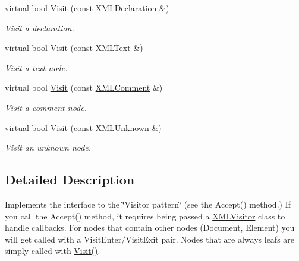 \begin{DoxyCompactItemize}
\mbox{\label{classtinyxml2_1_1_x_m_l_visitor_adc75bd459fc7ba8223b50f0616767f9a}} 
virtual bool \mbox{\hyperlink{classtinyxml2_1_1_x_m_l_visitor_adc75bd459fc7ba8223b50f0616767f9a}{Visit}} (const \mbox{\hyperlink{classtinyxml2_1_1_x_m_l_declaration}{X\+M\+L\+Declaration}} \&)
\begin{DoxyCompactList}\small\item\em Visit a declaration. \end{DoxyCompactList}\item 
\mbox{\label{classtinyxml2_1_1_x_m_l_visitor_af30233565856480ea48b6fa0d6dec65b}} 
virtual bool \mbox{\hyperlink{classtinyxml2_1_1_x_m_l_visitor_af30233565856480ea48b6fa0d6dec65b}{Visit}} (const \mbox{\hyperlink{classtinyxml2_1_1_x_m_l_text}{X\+M\+L\+Text}} \&)
\begin{DoxyCompactList}\small\item\em Visit a text node. \end{DoxyCompactList}\item 
\mbox{\label{classtinyxml2_1_1_x_m_l_visitor_acc8147fb5a85f6c65721654e427752d7}} 
virtual bool \mbox{\hyperlink{classtinyxml2_1_1_x_m_l_visitor_acc8147fb5a85f6c65721654e427752d7}{Visit}} (const \mbox{\hyperlink{classtinyxml2_1_1_x_m_l_comment}{X\+M\+L\+Comment}} \&)
\begin{DoxyCompactList}\small\item\em Visit a comment node. \end{DoxyCompactList}\item 
\mbox{\label{classtinyxml2_1_1_x_m_l_visitor_a14e4748387c34bf53d24e8119bb1f292}} 
virtual bool \mbox{\hyperlink{classtinyxml2_1_1_x_m_l_visitor_a14e4748387c34bf53d24e8119bb1f292}{Visit}} (const \mbox{\hyperlink{classtinyxml2_1_1_x_m_l_unknown}{X\+M\+L\+Unknown}} \&)
\begin{DoxyCompactList}\small\item\em Visit an unknown node. \end{DoxyCompactList}\end{DoxyCompactItemize}


\subsection{Detailed Description}
Implements the interface to the \char`\"{}\+Visitor pattern\char`\"{} (see the Accept() method.) If you call the Accept() method, it requires being passed a \mbox{\hyperlink{classtinyxml2_1_1_x_m_l_visitor}{X\+M\+L\+Visitor}} class to handle callbacks. For nodes that contain other nodes (Document, Element) you will get called with a Visit\+Enter/\+Visit\+Exit pair. Nodes that are always leafs are simply called with \mbox{\hyperlink{classtinyxml2_1_1_x_m_l_visitor_adc75bd459fc7ba8223b50f0616767f9a}{Visit()}}.

